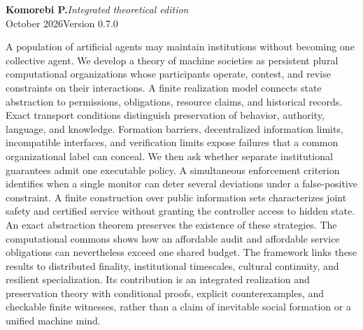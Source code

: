 \documentclass[11pt,letterpaper]{article}
\theoremstyle{plain}
\theoremstyle{definition}
\theoremstyle{remark}
\begin{document}
\hypersetup{pageanchor=false}
\begin{titlepage}
\thispagestyle{empty}
\vspace*{.25in}
\par
\vspace{.67in}
\vspace{.18in}
\vspace{.27in}
\noindent{\color{ink}\rule{\textwidth}{0.85pt}}\par
\vspace{.16in}
\noindent\textbf{Komorebi P.}\hfill\textit{Integrated theoretical edition}\\
 October 2026\hfill Version 0.7.0\par
\vspace{.48in}
\par\smallskip
\noindent A population of artificial agents may maintain institutions without becoming one collective agent. We develop a theory of machine societies as persistent plural computational organizations whose participants operate, contest, and revise constraints on their interactions. A finite realization model connects state abstraction to permissions, obligations, resource claims, and historical records. Exact transport conditions distinguish preservation of behavior, authority, language, and knowledge. Formation barriers, decentralized information limits, incompatible interfaces, and verification limits expose failures that a common organizational label can conceal. We then ask whether separate institutional guarantees admit one executable policy. A simultaneous enforcement criterion identifies when a single monitor can deter several deviations under a false-positive constraint. A finite construction over public information sets characterizes joint safety and certified service without granting the controller access to hidden state. An exact abstraction theorem preserves the existence of these strategies. The computational commons shows how an affordable audit and affordable service obligations can nevertheless exceed one shared budget. The framework links these results to distributed finality, institutional timescales, cultural continuity, and resilient specialization. Its contribution is an integrated realization and preservation theory with conditional proofs, explicit counterexamples, and checkable finite witnesses, rather than a claim of inevitable social formation or a unified machine mind.


\end{titlepage}
\end{document}
